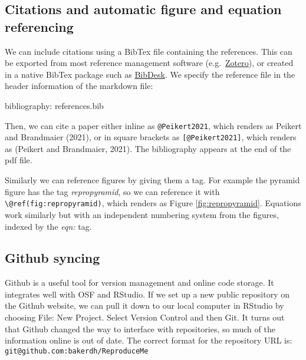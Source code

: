 \documentclass[
]{article}
\newenvironment{Shaded}{\begin{snugshade}}{\end{snugshade}}
\newcommand{\NormalTok}[1]{#1}
\newcommand{\SpecialCharTok}[1]{\textcolor[rgb]{0.00,0.00,0.00}{#1}}
\begin{document}
\hypertarget{citations-and-automatic-figure-and-equation-referencing}{%
\subsection{Citations and automatic figure and equation referencing}\label{citations-and-automatic-figure-and-equation-referencing}}

We can include citations using a BibTex file containing the references. This can be exported from most reference management software (e.g.~\href{https://www.zotero.org/}{Zotero}), or created in a native BibTex package such as \href{https://bibdesk.sourceforge.io/}{BibDesk}. We specify the reference file in the header information of the markdown file:

\begin{Shaded}
\begin{Highlighting}[]
\NormalTok{bibliography}\SpecialCharTok{:}\NormalTok{ references.bib}
\end{Highlighting}
\end{Shaded}

Then, we can cite a paper either inline as \texttt{@Peikert2021}, which renders as Peikert and Brandmaier (2021), or in square brackets as \texttt{{[}@Peikert2021{]}}, which renders as (Peikert and Brandmaier, 2021). The bibliography appears at the end of the pdf file.

Similarly we can reference figures by giving them a tag. For example the pyramid figure has the tag \emph{repropyramid}, so we can reference it with \texttt{\textbackslash{}@ref(fig:repropyramid)}, which renders as Figure \ref{fig:repropyramid}. Equations work similarly but with an independent numbering system from the figures, indexed by the \emph{eqn:} tag.

\hypertarget{github-syncing}{%
\subsection{Github syncing}\label{github-syncing}}

Github is a useful tool for version management and online code storage. It integrates well with OSF and RStudio. If we set up a new public repository on the Github website, we can pull it down to our local computer in RStudio by choosing File: New Project. Select Version Control and then Git. It turns out that Github changed the way to interface with repositories, so much of the information online is out of date. The correct format for the repository URL is: \texttt{git@github.com:bakerdh/ReproduceMe}
\end{document}
